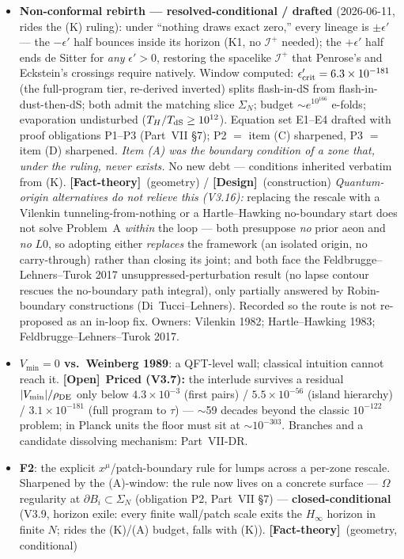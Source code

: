\documentclass[11pt]{article}
\newcommand{\factth}{\textcolor{green!40!black}{\textbf{[Fact-theory]}}}
\newcommand{\design}{\textcolor{blue!60!black}{\textbf{[Design]}}}
\newcommand{\open}{\textcolor{red!70!black}{\textbf{[Open]}}}
\begin{document}
\begin{itemize}[leftmargin=2.6em,itemsep=3pt]
\item[\textbf{(A)}] \textbf{Non-conformal rebirth --- resolved-conditional / drafted} (2026-06-11, rides the (K) ruling): under ``nothing draws exact zero,'' every lineage is $\pm\epsilon'$ --- the $-\epsilon'$ half bounces inside its horizon (K1, no $\mathscr I^+$ needed); the $+\epsilon'$ half ends de Sitter for \emph{any} $\epsilon'>0$, restoring the spacelike $\mathscr I^+$ that Penrose's and Eckstein's crossings require natively. Window computed: $\epsilon'_{\rm crit}=6.3\times10^{-181}$ (the full-program tier, re-derived inverted) splits flash-in-dS from flash-in-dust-then-dS; both admit the matching slice $\Sigma_N$; budget $\sim e^{10^{166}}$ e-folds; evaporation undisturbed ($T_H/T_{\rm dS}\ge10^{12}$). Equation set E1--E4 drafted with proof obligations P1--P3 (Part~VII \S7); P2 $=$ item (C) sharpened, P3 $=$ item (D) sharpened. \emph{Item (A) was the boundary condition of a zone that, under the ruling, never exists.} No new debt --- conditions inherited verbatim from (K). \factth\ (geometry) / \design\ (construction) \emph{Quantum-origin alternatives do not relieve this (V3.16):} replacing the rescale with a Vilenkin tunneling-from-nothing or a Hartle--Hawking no-boundary start does not solve Problem~A \emph{within} the loop --- both presuppose \emph{no} prior aeon and \emph{no} $L0$, so adopting either \emph{replaces} the framework (an isolated origin, no carry-through) rather than closing its joint; and both face the Feldbrugge--Lehners--Turok 2017 unsuppressed-perturbation result (no lapse contour rescues the no-boundary path integral), only partially answered by Robin-boundary constructions (Di~Tucci--Lehners). Recorded so the route is not re-proposed as an in-loop fix. Owners: Vilenkin 1982; Hartle--Hawking 1983; Feldbrugge--Lehners--Turok 2017.
\item[\textbf{(B)}] \textbf{$V_{\min}=0$ vs.\ Weinberg 1989}: a QFT-level wall; classical intuition cannot reach it. \open\ \textbf{Priced (V3.7):} the interlude survives a residual $|V_{\min}|/\rho_{\rm DE}$ only below $4.3\times10^{-3}$ (first pairs) / $5.5\times10^{-56}$ (island hierarchy) / $3.1\times10^{-181}$ (full program to $\tau$) --- $\sim$59 decades beyond the classic $10^{-122}$ problem; in Planck units the floor must sit at $\sim10^{-303}$. Branches and a candidate dissolving mechanism: Part~VII-DR.
\item[\textbf{(C)}] \textbf{F2}: the explicit $x^\mu$/patch-boundary rule for lumps across a per-zone rescale. Sharpened by the (A)-window: the rule now lives on a concrete surface --- $\Omega$ regularity at $\partial B_i\subset\Sigma_N$ (obligation P2, Part~VII \S7) --- \textbf{closed-conditional} (V3.9, horizon exile: every finite wall/patch scale exits the $H_\infty$ horizon in finite $N$; rides the (K)/(A) budget, falls with (K)). \factth\ (geometry, conditional)

\end{itemize}
\end{document}
